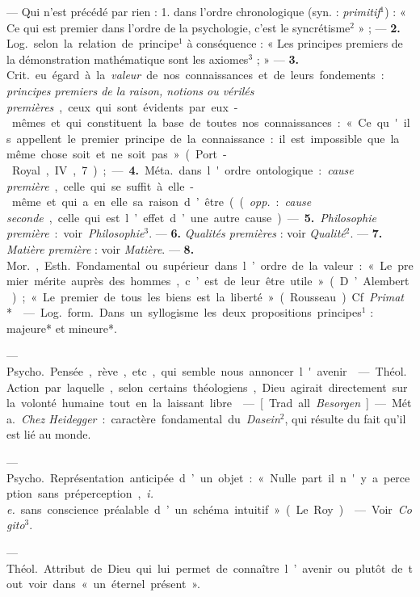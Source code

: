 \begin{itemize}[leftmargin=1cm, label=, itemsep=1pt]
 — Qui n’est précédé par rien : 1. dans l’ordre chronologique
(syn. : {\it primitif}$^1$) : « Ce qui est premier dans l’ordre de la
psychologie, c’est le syncrétisme$^2$ » ; — {\bf 2.} \si{Log.} selon la
relation de principe$^1$ à conséquence : « Les principes premiers de la
démonstration mathématique sont les axiomes$^3$ ; » — {\bf 3.} \si{Crit.} eu
égard à la {\it valeur} de nos connaissances et de leurs fondements : {\it
principes premiers de la raison, notions ou vérilés premières}, ceux qui sont
évidents par eux-mêmes et qui constituent la base de toutes nos
connaissances : « Ce qu'ils appellent le premier principe de la
connaissance : il est impossible que la même chose soit et ne soit pas
» (Port-Royal, IV, 7) ; —
{\bf 4.} \si{Méta.} dans l'ordre ontologique : {\it cause première}, celle
qui se suffit à elle-même et qui a en elle sa raison d’être (({\it opp.} :
{\it cause seconde}, celle qui est l’effet d’une autre cause). —  {\bf 5.}
{\it Philosophie première} : voir {\it Philosophie}$^3$. — {\bf 6.} {\it
Qualités premières} : voir {\it Qualité}$^2$. — {\bf 7.} {\it Matière
première} : voir {\it Matière}. — {\bf 8.} \si{Mor.}, \si{Esth.} Fondamental
ou supérieur dans l’ordre de la valeur : « Le premier mérite auprès des
hommes, c’est de leur être utile » (D’Alembert) ; « Le premier de tous les
biens est la liberté» (Rousseau). Cf. {\it Primat}*.

 — \si{Log.} \si{form.} Dans un syllogisme les deux
propositions principes$^1$ : majeure* et mineure*.

 — \si{Psycho.} Pensée, rève, etc., qui semble nous annoncer
l'avenir.

 — \si{Théol.} Action par laquelle, selon certains
théologiens, Dieu agirait directement sur la volonté humaine tout en la
laissant libre.

 — [Trad. all. {\it Besorgen}] — \si{Méta.} {\it Chez
Heidegger} : caractère fondamental du {\it Dasein}$^2$, qui résulte du fait
qu'il est lié au monde.

 — \si{Psycho.} Représentation anticipée d’un objet : «
Nulle part il n'y a perception sans préperception, {\it i. e.} sans
conscience préalable d’un schéma intuitif. » (Le Roy).

 — Voir {\it Cogito}$^3$.

 — \si{Théol.} Attribut de Dieu qui lui permet de connaître
l’avenir ou plutôt de tout voir dans « un éternel présent ».


\end{itemize}
